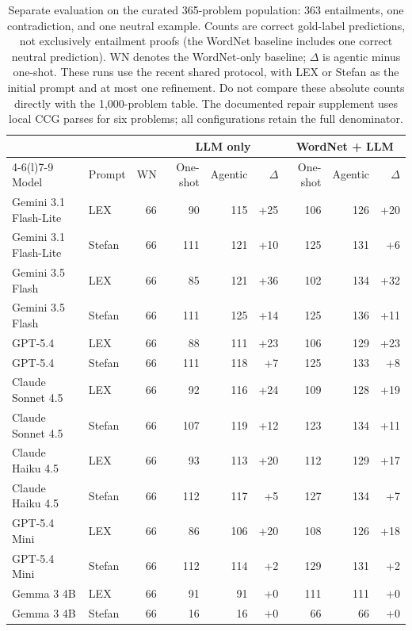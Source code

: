 \begin{table}[t]
\centering
\small
\setlength{\tabcolsep}{4pt}
\begin{tabular}{@{}llrrrrrrr@{}}
\toprule
& & & \multicolumn{3}{c}{LLM only} & \multicolumn{3}{c}{WordNet + LLM} \\
\cmidrule(lr){4-6}\cmidrule(l){7-9}
Model & Prompt & WN & One-shot & Agentic & $\Delta$ & One-shot & Agentic & $\Delta$ \\
\midrule
Gemini 3.1 Flash-Lite & LEX & 66 & 90 & 115 & +25 & 106 & 126 & +20 \\
Gemini 3.1 Flash-Lite & Stefan & 66 & 111 & 121 & +10 & 125 & 131 & +6 \\
\addlinespace[2pt]
Gemini 3.5 Flash & LEX & 66 & 85 & 121 & +36 & 102 & 134 & +32 \\
Gemini 3.5 Flash & Stefan & 66 & 111 & 125 & +14 & 125 & 136 & +11 \\
\addlinespace[2pt]
GPT-5.4 & LEX & 66 & 88 & 111 & +23 & 106 & 129 & +23 \\
GPT-5.4 & Stefan & 66 & 111 & 118 & +7 & 125 & 133 & +8 \\
\addlinespace[2pt]
Claude Sonnet 4.5 & LEX & 66 & 92 & 116 & +24 & 109 & 128 & +19 \\
Claude Sonnet 4.5 & Stefan & 66 & 107 & 119 & +12 & 123 & 134 & +11 \\
\addlinespace[2pt]
Claude Haiku 4.5 & LEX & 66 & 93 & 113 & +20 & 112 & 129 & +17 \\
Claude Haiku 4.5 & Stefan & 66 & 112 & 117 & +5 & 127 & 134 & +7 \\
\addlinespace[2pt]
GPT-5.4 Mini & LEX & 66 & 86 & 106 & +20 & 108 & 126 & +18 \\
GPT-5.4 Mini & Stefan & 66 & 112 & 114 & +2 & 129 & 131 & +2 \\
\addlinespace[2pt]
Gemma 3 4B & LEX & 66 & 91 & 91 & +0 & 111 & 111 & +0 \\
Gemma 3 4B & Stefan & 66 & 16 & 16 & +0 & 66 & 66 & +0 \\
\bottomrule
\end{tabular}
\caption{Separate evaluation on the curated 365-problem population:
363 entailments, one contradiction, and one neutral example. Counts are
correct gold-label predictions, not exclusively entailment proofs (the
WordNet baseline includes one correct neutral prediction). WN denotes the
WordNet-only baseline; $\Delta$ is agentic minus one-shot. These runs use
the recent shared protocol, with LEX or Stefan as the initial prompt and
at most one refinement. Do not compare these absolute counts directly
with the 1,000-problem table. The documented repair supplement uses local
CCG parses for six problems; all configurations retain the full denominator.}
\label{tab:langpro-results-365}
\end{table}
